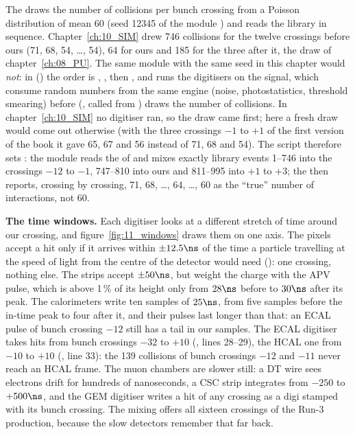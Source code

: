 \begin{plainwords}
The  draws the number of collisions per bunch crossing from a Poisson distribution of mean 60
(seed 12345 of the module ) and reads the library in sequence. Chapter~\ref{ch:10_SIM}
drew 746 collisions for the twelve crossings before ours (71, 68, 54, \ldots, 54), 64 for ours and 185 for the three
after it, the draw of chapter~\ref{ch:08_PU}. The same module with the same seed in this chapter would \emph{not}: in
 () the order is ,
, then , and  runs the digitisers on the signal, which consume random
numbers from the same engine (noise, photostatistics, threshold smearing) before 
(, called from ) draws the
number of collisions. In chapter~\ref{ch:10_SIM} no digitiser ran, so the draw came first; here a fresh draw would
come out otherwise (with the three crossings $-1$ to $+1$ of the first version of the book it gave 65, 67 and 56
instead of 71, 68 and 54). The script therefore sets : the module reads the
 of  and mixes exactly library events 1--746 into the
crossings $-12$ to $-1$, 747--810 into ours and 811--995 into $+1$ to $+3$; the  then
reports, crossing by crossing, 71, 68, \ldots, 64, \ldots, 60 as the ``true'' number of interactions, not 60.
\end{plainwords}

\textbf{The time windows.} Each digitiser looks at a different stretch of time around our crossing, and
figure~\ref{fig:11_windows} draws them on one axis. The pixels accept a hit only if it arrives within $\pm12.5\ns$ of
the time a particle travelling at the speed of light from the centre of the detector would need
(): one crossing, nothing else. The strips accept $\pm50\ns$, but weight the charge with
the APV pulse, which is above 1\,\% of its height only from $28\ns$ before to $30\ns$ after its peak. The
calorimeters write ten
samples of $25\ns$, from five samples before the in-time peak to four after it, and their pulses last longer than
that: an ECAL pulse of bunch crossing $-12$ still has a tail in our samples. The ECAL digitiser takes hits from bunch
crossings $-32$ to $+10$ (, lines 28--29), the HCAL one from
$-10$ to $+10$ (, line 33): the 139 collisions of bunch crossings $-12$ and
$-11$ never reach an HCAL frame. The muon chambers are slower still: a DT wire sees electrons drift for hundreds of
nanoseconds, a CSC strip integrates from $-250$ to $+500\ns$, and the GEM digitiser writes a hit of any crossing as a
digi stamped with its bunch crossing. The mixing offers all sixteen crossings of the Run-3 production, because the
slow detectors remember that far back.

